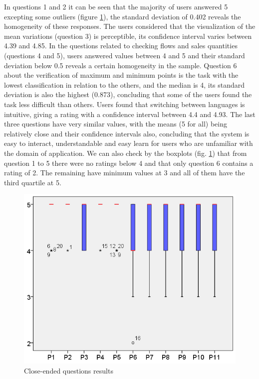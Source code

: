 \documentclass[letterpaper, 10 pt, conference]{ieeeconf}  %
\begin{document}
In questions 1 and 2 it can be seen that the majority of users answered 5 excepting some outliers (figure \ref{fig:boxplotQuest}), the standard deviation of 0.402 reveals the homogeneity of these responses.
The users considered that the visualization of the mean variations (question 3) is perceptible, its confidence interval varies between 4.39 and 4.85. In the questions related to checking flows and sales quantities (questions 4 and 5), users answered values between 4 and 5 and their standard deviation below 0.5 reveals a certain homogeneity in the sample. \newline
Question 6 about the verification of maximum and minimum points is the task with the lowest classification in relation to the others, and the median is 4, its standard deviation is also the highest (0.873), concluding that some of the users found the task less difficult than others. \newline
Users found that switching between languages is intuitive, giving a rating with a confidence interval between 4.4 and 4.93.
The last three questions have very similar values, with the means (5 for all) being relatively close and their confidence intervals also, concluding that the system is easy to interact, understandable and easy learn for users who are unfamiliar with the domain of application.
We can also check by the boxplots (fig. \ref{fig:boxplotQuest}) that from question 1 to 5 there were no ratings below 4 and that only question 6 contains a rating of 2. The remaining have minimum values at 3 and all of them have the third quartile at 5.

\begin{figure}[ht]
    \centering
    \includegraphics[width=\linewidth]{Figures/boxplot_quest.png}
    \caption{Close-ended questions results}
        \label{fig:boxplotQuest}
\end{figure}
\end{document}
